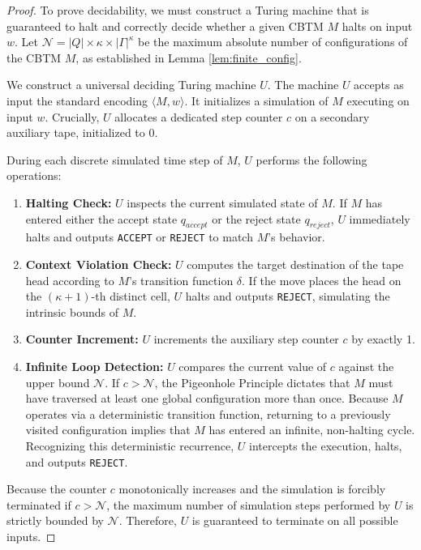 \begin{proof}
To prove decidability, we must construct a Turing machine that is guaranteed to halt and correctly decide whether a given CBTM $M$ halts on input $w$.
Let $\mathcal{N} = |Q| \times \kappa \times |\Gamma|^\kappa$ be the maximum absolute number of configurations of the CBTM $M$, as established in Lemma \ref{lem:finite_config}. 

We construct a universal deciding Turing machine $U$. The machine $U$ accepts as input the standard encoding $\langle M, w \rangle$. It initializes a simulation of $M$ executing on input $w$. 
Crucially, $U$ allocates a dedicated step counter $c$ on a secondary auxiliary tape, initialized to $0$. 

During each discrete simulated time step of $M$, $U$ performs the following operations:
\begin{enumerate}
    \item \textbf{Halting Check:} $U$ inspects the current simulated state of $M$. If $M$ has entered either the accept state $q_{accept}$ or the reject state $q_{reject}$, $U$ immediately halts and outputs \texttt{ACCEPT} or \texttt{REJECT} to match $M$'s behavior.
    \item \textbf{Context Violation Check:} $U$ computes the target destination of the tape head according to $M$'s transition function $\delta$. If the move places the head on the $(\kappa+1)$-th distinct cell, $U$ halts and outputs \texttt{REJECT}, simulating the intrinsic bounds of $M$.
    \item \textbf{Counter Increment:} $U$ increments the auxiliary step counter $c$ by exactly 1.
    \item \textbf{Infinite Loop Detection:} $U$ compares the current value of $c$ against the upper bound $\mathcal{N}$. If $c > \mathcal{N}$, the Pigeonhole Principle dictates that $M$ must have traversed at least one global configuration more than once. Because $M$ operates via a deterministic transition function, returning to a previously visited configuration implies that $M$ has entered an infinite, non-halting cycle. Recognizing this deterministic recurrence, $U$ intercepts the execution, halts, and outputs \texttt{REJECT}.
\end{enumerate}

Because the counter $c$ monotonically increases and the simulation is forcibly terminated if $c > \mathcal{N}$, the maximum number of simulation steps performed by $U$ is strictly bounded by $\mathcal{N}$. Therefore, $U$ is guaranteed to terminate on all possible inputs.


\end{proof}
